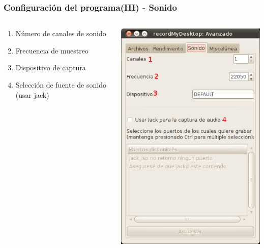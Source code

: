 \documentclass{beamer}
\begin{document}
		\begin{frame}
			\frametitle{Configuración del programa(III) - Sonido}
			\begin{columns}
				\begin{column}[l]{5cm}
					\justifying
					\begin{enumerate}
						\item Número de canales de sonido
						\item Frecuencia de muestreo
						\item Dispositivo de captura
						\item Selección de fuente de sonido (usar jack)
					\end{enumerate}
				\end{column}
				\begin{column}[r]{5cm}
					\includegraphics[height=0.8\textheight, keepaspectratio=true]{Imagenes/Interfaz/04.png}
				\end{column}
			\end{columns}
		\end{frame}
\end{document}
